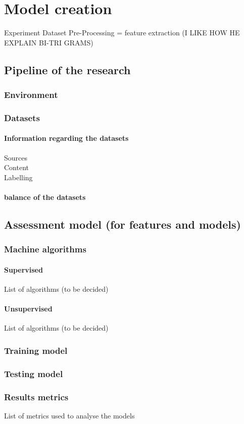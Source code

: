 
\chapter{Model creation} %

\label{Model creation}
Experiment Dataset Pre-Processing = feature extraction (I LIKE HOW HE EXPLAIN BI-TRI GRAMS)
\section{Pipeline of the research}
\subsection{Environment}
\subsection{Datasets}
\subsubsection{Information regarding the datasets}
Sources\\
Content\\
Labelling\\
\subsubsection{balance of the datasets}
\section{Assessment model (for features and models)}
\subsection{Machine algorithms}
\subsubsection{Supervised}
List of algorithms (to be decided)
\subsubsection{Unsupervised}
List of algorithms (to be decided)
\subsection{Training model}
\subsection{Testing model}
\subsection{Results metrics}
List of metrics used to analyse the models 
